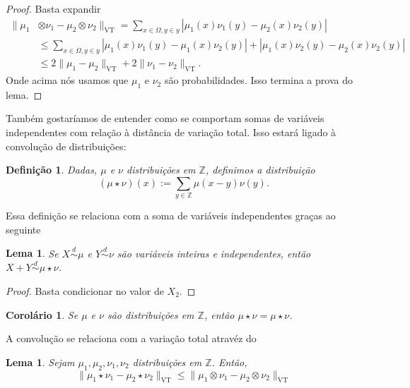 \documentclass[reqno, draft]{book}
\newcommand*\1{\mathds{1}}
\newtheorem{corollary}[theorem]{Corolário}
\newtheorem{lemma}[theorem]{Lema}
\newtheorem{definition}[theorem]{Definição}
\DeclareMathOperator{\VT}{VT}
\begin{document}
\begin{proof}
Basta expandir
\begin{equation}
  \begin{split}
    \lVert \mu_1 & \otimes \nu_1 - \mu_2 \otimes \nu_2 \rVert_{\VT} = \sum_{x \in \Omega, y \in y} |\mu_1(x)\nu_1(y) - \mu_2(x)\nu_2(y)|\\
    & \leq \sum_{x \in \Omega, y \in y} |\mu_1(x)\nu_1(y) - \mu_1(x)\nu_2(y)| + |\mu_1(x)\nu_2(y) - \mu_2(x)\nu_2(y)|\\
    & \leq 2\lVert \mu_1 - \mu_2 \rVert_{\VT} + 2\lVert \nu_1 - \nu_2 \rVert_{\VT}.
  \end{split}
\end{equation}
Onde acima nós usamos que $\mu_1$ e $\nu_2$ são probabilidades. Isso termina a prova do lema.
\end{proof}

Também gostaríamos de entender como se comportam somas de variáveis independentes com relação à distância de variação total. Isso estará ligado à convolução de distribuições:

\begin{definition}
Dadas, $\mu$ e $\nu$ distribuições em $\mathbb{Z}$, definimos a distribuição
\begin{equation}
  (\mu \star \nu)(x) := \sum_{y \in \mathbb{Z}} \mu(x-y) \nu(y).
\end{equation}
\end{definition}

Essa definição se relaciona com a soma de variáveis independentes graças ao seguinte
\begin{lemma}
Se $X \overset{d}\sim \mu$ e $Y \overset{d}\sim \nu$ são variáveis inteiras e independentes, então $X + Y \overset{d}\sim \mu \star \nu$.
\end{lemma}

\begin{proof}
Basta condicionar no valor de $X_2$.
\end{proof}

\begin{corollary}
Se $\mu$ e $\nu$ são distribuições em $\mathbb{Z}$, então $\mu \star \nu = \mu \star \nu$.
\end{corollary}

A convolução se relaciona com a variação total atravéz do
\begin{lemma}
\label{l:vt_conv}
Sejam $\mu_1, \mu_2, \nu_1, \nu_2$ distribuições em $\mathbb{Z}$. Então,
\begin{equation}
  \lVert \mu_1 \star \nu_1 - \mu_2 \star \nu_2 \rVert_{\VT} \leq \lVert \mu_1 \otimes \nu_1 - \mu_2 \otimes \nu_2 \rVert_{\VT}
\end{equation}
\end{lemma}
\end{document}
